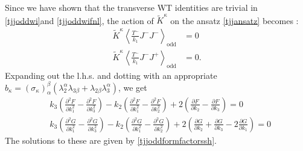 \documentclass[a4paper,11pt]{article}
\begin{document}
Since we have shown that the transverse WT identities are trivial in  \eqref{tjjoddwi}and \eqref{tjjoddwifnl}, the action of $\widetilde{K}^{\kappa}$ on the ansatz \eqref{tjjansatz} becomes :
\begin{align}
\widetilde{K}^{\kappa}\left\langle \frac{T^-}{k_1}J^-J^- \right\rangle_{\text{odd}}&=0\nonumber\\
\widetilde{K}^{\kappa}\left\langle \frac{T^-}{k_1}J^-J^+ \right\rangle_{\text{odd}}&=0.
\end{align}
Expanding out the l.h.s. and dotting with an appropriate $b_{\kappa}=(\sigma_{\kappa})_{\alpha}^{\beta}(\lambda_2^{\alpha}\lambda_{3\beta}+\lambda_{2\beta}\lambda_3^{\alpha})$, we get
\begin{align}
&k_3\left(\frac{\partial^2 F}{\partial k_1^2}-\frac{\partial^2 F}{\partial k_3^2}\right)-k_2\left(\frac{\partial^2 F}{\partial k_1^2}-\frac{\partial^2 F}{\partial k_2^2}\right)+2\left(\frac{\partial F}{\partial k_2}-\frac{\partial F}{\partial k_3}\right)=0 \\[5 pt]
&k_3\left(\frac{\partial^2 G}{\partial k_1^2}-\frac{\partial^2 G}{\partial k_3^2}\right)-k_2\left(\frac{\partial^2 G}{\partial k_1^2}-\frac{\partial^2 G}{\partial k_2^2}\right)+2\left(\frac{\partial G}{\partial k_2}+\frac{\partial G}{\partial k_3}-2\frac{\partial G}{\partial k_1}\right)=0
\end{align}
The solutions to these are given by \eqref{tjjoddformfactorssh}.


\end{document}
